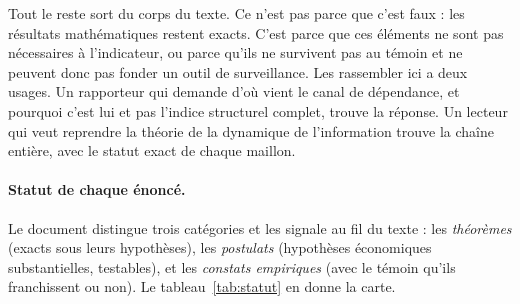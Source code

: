 \documentclass[11pt]{article}
\theoremstyle{definition}
\theoremstyle{remark}
\begin{document}
Tout le reste sort du corps du texte. Ce n'est pas parce que c'est faux : les
résultats mathématiques restent exacts. C'est parce que ces éléments ne sont
pas nécessaires à l'indicateur, ou parce qu'ils ne survivent pas au témoin et
ne peuvent donc pas fonder un outil de surveillance. Les rassembler ici a deux
usages. Un rapporteur qui demande d'où vient le canal de dépendance, et pourquoi
c'est lui et pas l'indice structurel complet, trouve la réponse. Un lecteur qui
veut reprendre la théorie de la dynamique de l'information trouve la chaîne
entière, avec le statut exact de chaque maillon.

\paragraph{Statut de chaque énoncé.} Le document distingue trois catégories et
les signale au fil du texte : les \emph{théorèmes} (exacts sous leurs
hypothèses), les \emph{postulats} (hypothèses économiques substantielles,
testables), et les \emph{constats empiriques} (avec le témoin qu'ils
franchissent ou non). Le tableau~\ref{tab:statut} en donne la carte.
\end{document}
